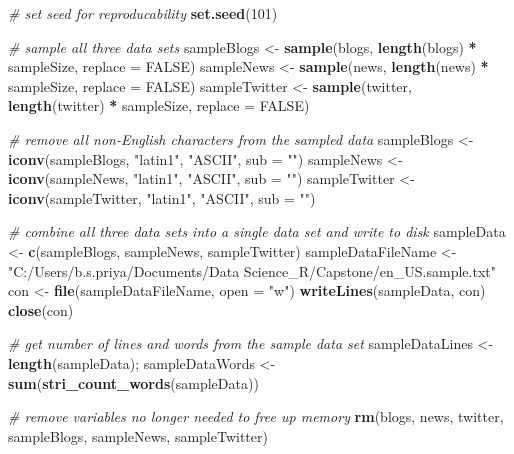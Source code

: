\documentclass[]{article}
\newenvironment{Shaded}{\begin{snugshade}}{\end{snugshade}}
\newcommand{\CommentTok}[1]{\textcolor[rgb]{0.56,0.35,0.01}{\textit{#1}}}
\newcommand{\DataTypeTok}[1]{\textcolor[rgb]{0.13,0.29,0.53}{#1}}
\newcommand{\DecValTok}[1]{\textcolor[rgb]{0.00,0.00,0.81}{#1}}
\newcommand{\KeywordTok}[1]{\textcolor[rgb]{0.13,0.29,0.53}{\textbf{#1}}}
\newcommand{\NormalTok}[1]{#1}
\newcommand{\OperatorTok}[1]{\textcolor[rgb]{0.81,0.36,0.00}{\textbf{#1}}}
\newcommand{\OtherTok}[1]{\textcolor[rgb]{0.56,0.35,0.01}{#1}}
\newcommand{\StringTok}[1]{\textcolor[rgb]{0.31,0.60,0.02}{#1}}
\begin{document}
\begin{Shaded}
\begin{Highlighting}[]
\CommentTok{# set seed for reproducability}
\KeywordTok{set.seed}\NormalTok{(}\DecValTok{101}\NormalTok{)}

\CommentTok{# sample all three data sets}
\NormalTok{sampleBlogs <-}\StringTok{ }\KeywordTok{sample}\NormalTok{(blogs, }\KeywordTok{length}\NormalTok{(blogs) }\OperatorTok{*}\StringTok{ }\NormalTok{sampleSize, }\DataTypeTok{replace =} \OtherTok{FALSE}\NormalTok{)}
\NormalTok{sampleNews <-}\StringTok{ }\KeywordTok{sample}\NormalTok{(news, }\KeywordTok{length}\NormalTok{(news) }\OperatorTok{*}\StringTok{ }\NormalTok{sampleSize, }\DataTypeTok{replace =} \OtherTok{FALSE}\NormalTok{)}
\NormalTok{sampleTwitter <-}\StringTok{ }\KeywordTok{sample}\NormalTok{(twitter, }\KeywordTok{length}\NormalTok{(twitter) }\OperatorTok{*}\StringTok{ }\NormalTok{sampleSize, }\DataTypeTok{replace =} \OtherTok{FALSE}\NormalTok{)}

\CommentTok{# remove all non-English characters from the sampled data}
\NormalTok{sampleBlogs <-}\StringTok{ }\KeywordTok{iconv}\NormalTok{(sampleBlogs, }\StringTok{"latin1"}\NormalTok{, }\StringTok{"ASCII"}\NormalTok{, }\DataTypeTok{sub =} \StringTok{""}\NormalTok{)}
\NormalTok{sampleNews <-}\StringTok{ }\KeywordTok{iconv}\NormalTok{(sampleNews, }\StringTok{"latin1"}\NormalTok{, }\StringTok{"ASCII"}\NormalTok{, }\DataTypeTok{sub =} \StringTok{""}\NormalTok{)}
\NormalTok{sampleTwitter <-}\StringTok{ }\KeywordTok{iconv}\NormalTok{(sampleTwitter, }\StringTok{"latin1"}\NormalTok{, }\StringTok{"ASCII"}\NormalTok{, }\DataTypeTok{sub =} \StringTok{""}\NormalTok{)}

\CommentTok{# combine all three data sets into a single data set and write to disk}
\NormalTok{sampleData <-}\StringTok{ }\KeywordTok{c}\NormalTok{(sampleBlogs, sampleNews, sampleTwitter)}
\NormalTok{sampleDataFileName <-}\StringTok{ "C:/Users/b.s.priya/Documents/Data Science_R/Capstone/en_US.sample.txt"}
\NormalTok{con <-}\StringTok{ }\KeywordTok{file}\NormalTok{(sampleDataFileName, }\DataTypeTok{open =} \StringTok{"w"}\NormalTok{)}
\KeywordTok{writeLines}\NormalTok{(sampleData, con)}
\KeywordTok{close}\NormalTok{(con)}

\CommentTok{# get number of lines and words from the sample data set}
\NormalTok{sampleDataLines <-}\StringTok{ }\KeywordTok{length}\NormalTok{(sampleData);}
\NormalTok{sampleDataWords <-}\StringTok{ }\KeywordTok{sum}\NormalTok{(}\KeywordTok{stri_count_words}\NormalTok{(sampleData))}

\CommentTok{# remove variables no longer needed to free up memory}
\KeywordTok{rm}\NormalTok{(blogs, news, twitter, sampleBlogs, sampleNews, sampleTwitter)}
\end{Highlighting}
\end{Shaded}
\end{document}
